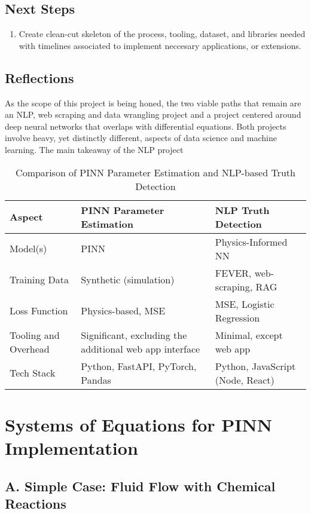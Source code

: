 \documentclass[11pt,letterpaper]{article}
\newcommand{\nextSteps}[1]{
    \subsection*{Next Steps}
    #1
}
\newcommand{\reflections}[1]{
    \subsection*{Reflections}
    #1
}
\begin{document}
\nextSteps{
\begin{enumerate}
    \item Create clean-cut skeleton of the process, tooling, dataset, and libraries needed with timelines associated to implement neccesary applications, or extensions.
\end{enumerate}
}

\reflections{
As the scope of this project is being honed, the two viable paths that remain are an NLP, web scraping and data wrangling project and a project centered around deep neural networks that overlaps with differential equations. Both projects involve heavy, yet distinctly different, aspects of data science and machine learning. The main takeaway of the NLP project

\begin{table}[h!]
\centering
\begin{tabular}{|>{\centering\arraybackslash}p{3.5cm}|
                >{\centering\arraybackslash}p{5cm}|
                >{\centering\arraybackslash}p{5cm}|}
\hline
\textbf{Aspect} & \textbf{PINN Parameter Estimation} & \textbf{NLP Truth Detection} \\
\hline
Model(s) & PINN & Physics-Informed NN \\
Training Data & Synthetic (simulation) & FEVER, web-scraping, RAG \\
Loss Function & Physics-based, MSE & MSE, Logistic Regression \\
Tooling and Overhead & Significant, excluding the additional web app interface & Minimal, except web app \\
Tech Stack & Python, FastAPI, PyTorch, Pandas & Python, JavaScript (Node, React)\\
\hline
\end{tabular}
\caption{Comparison of PINN Parameter Estimation and NLP-based Truth Detection}
\end{table}


}


\newpage
\appendix
\section{Systems of Equations for PINN Implementation}
\subsection*{A. Simple Case: Fluid Flow with Chemical Reactions}
\end{document}
